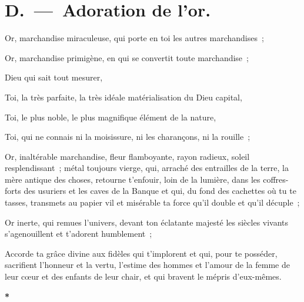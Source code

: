 \documentclass[french,twoside]{book} %
\begin{document}
\begin{center}
\end{center}


\section[{D. — Adoration de l’or.}]{D. — Adoration de l’or.}

Or, marchandise miraculeuse, qui porte en toi les autres marchandises ;\par
Or, marchandise primigène, en qui se convertit toute marchandise ;\par
Dieu qui sait tout mesurer,\par
Toi, la très parfaite, la très idéale matérialisation du Dieu capital,\par
Toi, le plus noble, le plus magnifique élément de la nature,\par
Toi, qui ne connais ni la moisissure, ni les charançons, ni la rouille ;\par
Or, inaltérable marchandise, fleur flamboyante, rayon radieux, soleil resplendissant ; métal toujours vierge, qui, arraché des entrailles de la terre, la mère antique des choses, retourne t’enfouir, loin de la lumière, dans les coffres-forts des usuriers et les caves de la Banque et qui, du fond des cachettes où tu te tasses, transmets au papier vil et misérable ta force qu’il double et qu’il décuple ;\par
Or inerte, qui remues l’univers, devant ton éclatante majesté les siècles vivants s’agenouillent et t’adorent humblement ;\par
Accorde ta grâce divine aux fidèles qui t’implorent et qui, pour te posséder, sacrifient l’honneur et la vertu, l’estime des hommes et l’amour de la femme de leur cœur et des enfants de leur chair, et qui bravent le mépris d’eux-mêmes.\par

\begin{center}
\noindent \textbf{*}\par
\end{center}
\end{document}

